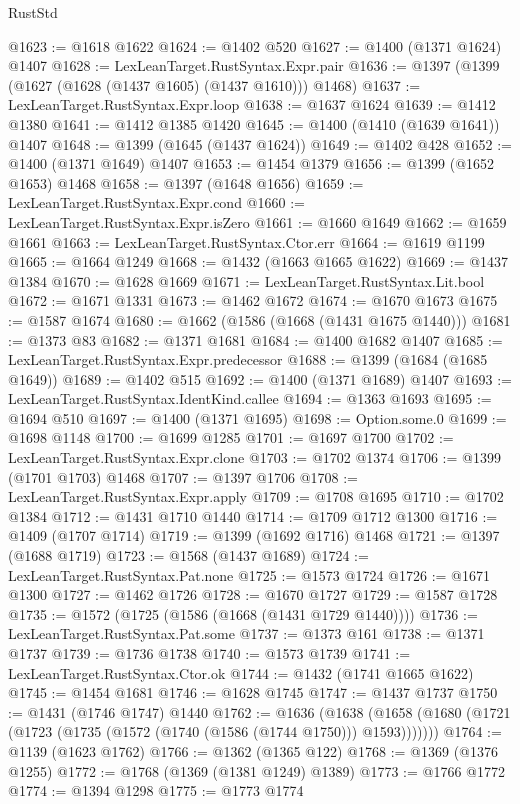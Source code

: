 \begin{lexlean}{RustStd}
\begin{coremodule}
@1623 := @1618 @1622
@1624 := @1402 @520
@1627 := @1400 (@1371 @1624) @1407
@1628 := LexLeanTarget.RustSyntax.Expr.pair
@1636 := @1397 (@1399 (@1627 (@1628 (@1437 @1605) (@1437 @1610))) @1468)
@1637 := LexLeanTarget.RustSyntax.Expr.loop
@1638 := @1637 @1624
@1639 := @1412 @1380
@1641 := @1412 @1385 @1420
@1645 := @1400 (@1410 (@1639 @1641)) @1407
@1648 := @1399 (@1645 (@1437 @1624))
@1649 := @1402 @428
@1652 := @1400 (@1371 @1649) @1407
@1653 := @1454 @1379
@1656 := @1399 (@1652 @1653) @1468
@1658 := @1397 (@1648 @1656)
@1659 := LexLeanTarget.RustSyntax.Expr.cond
@1660 := LexLeanTarget.RustSyntax.Expr.isZero
@1661 := @1660 @1649
@1662 := @1659 @1661
@1663 := LexLeanTarget.RustSyntax.Ctor.err
@1664 := @1619 @1199
@1665 := @1664 @1249
@1668 := @1432 (@1663 @1665 @1622)
@1669 := @1437 @1384
@1670 := @1628 @1669
@1671 := LexLeanTarget.RustSyntax.Lit.bool
@1672 := @1671 @1331
@1673 := @1462 @1672
@1674 := @1670 @1673
@1675 := @1587 @1674
@1680 := @1662 (@1586 (@1668 (@1431 @1675 @1440)))
@1681 := @1373 @83
@1682 := @1371 @1681
@1684 := @1400 @1682 @1407
@1685 := LexLeanTarget.RustSyntax.Expr.predecessor
@1688 := @1399 (@1684 (@1685 @1649))
@1689 := @1402 @515
@1692 := @1400 (@1371 @1689) @1407
@1693 := LexLeanTarget.RustSyntax.IdentKind.callee
@1694 := @1363 @1693
@1695 := @1694 @510
@1697 := @1400 (@1371 @1695)
@1698 := Option.some.{0}
@1699 := @1698 @1148
@1700 := @1699 @1285
@1701 := @1697 @1700
@1702 := LexLeanTarget.RustSyntax.Expr.clone
@1703 := @1702 @1374
@1706 := @1399 (@1701 @1703) @1468
@1707 := @1397 @1706
@1708 := LexLeanTarget.RustSyntax.Expr.apply
@1709 := @1708 @1695
@1710 := @1702 @1384
@1712 := @1431 @1710 @1440
@1714 := @1709 @1712 @1300
@1716 := @1409 (@1707 @1714)
@1719 := @1399 (@1692 @1716) @1468
@1721 := @1397 (@1688 @1719)
@1723 := @1568 (@1437 @1689)
@1724 := LexLeanTarget.RustSyntax.Pat.none
@1725 := @1573 @1724
@1726 := @1671 @1300
@1727 := @1462 @1726
@1728 := @1670 @1727
@1729 := @1587 @1728
@1735 := @1572 (@1725 (@1586 (@1668 (@1431 @1729 @1440))))
@1736 := LexLeanTarget.RustSyntax.Pat.some
@1737 := @1373 @161
@1738 := @1371 @1737
@1739 := @1736 @1738
@1740 := @1573 @1739
@1741 := LexLeanTarget.RustSyntax.Ctor.ok
@1744 := @1432 (@1741 @1665 @1622)
@1745 := @1454 @1681
@1746 := @1628 @1745
@1747 := @1437 @1737
@1750 := @1431 (@1746 @1747) @1440
@1762 := @1636
    (@1638 (@1658 (@1680 (@1721 (@1723 (@1735 (@1572 (@1740 (@1586 (@1744 @1750))) @1593)))))))
@1764 := @1139 (@1623 @1762)
@1766 := @1362 (@1365 @122)
@1768 := @1369 (@1376 @1255)
@1772 := @1768 (@1369 (@1381 @1249) @1389)
@1773 := @1766 @1772
@1774 := @1394 @1298
@1775 := @1773 @1774

\end{coremodule}
\end{lexlean}

